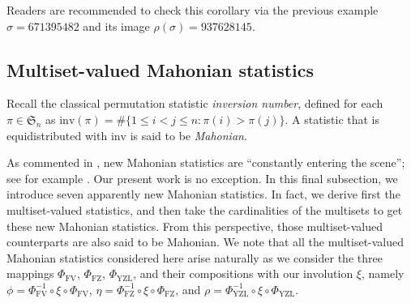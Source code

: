 \documentclass[12pt]{amsart}
\numberwithin{equation}{section}
\theoremstyle{plain}
\newtheorem{corollary}[theorem]{Corollary}
\theoremstyle{definition}
\def\FV{\mathrm{FV}}
\def\FZ{\mathrm{FZ}}
\def\YZL{\mathrm{YZL}}
\def\SS{\mathfrak{S}}
\def\vbot{\mathrm{vbot}}
\def\vedif{\mathrm{vedif}}
\def\vnest{\mathrm{vnest}}
\def\inv{\mathrm{inv}}
\def\inv{\mathrm{inv}}
\begin{document}

Readers are recommended to check this corollary via the previous example $\sigma=671395482$ and its image $\rho(\sigma)=937628145$.



\subsection{Multiset-valued Mahonian statistics}\label{subsec:Mahonian}
Recall the classical permutation statistic \emph{inversion number}, defined for each $\pi\in\SS_n$ as $\inv(\pi)=\#\{1\le i<j\le n : \pi(i)>\pi(j)\}.$ A statistic that is equidistributed with $\inv$ is said to be \emph{Mahonian}.

As commented in \cite{CSZ}, new Mahonian statistics are ``constantly entering the scene''; see for example \cite{FZ90,SS,CSZ,BS}. Our present work is no exception. In this final subsection, we introduce seven apparently new Mahonian statistics. In fact, we derive first the multiset-valued statistics, and then take the cardinalities of the multisets to get these new Mahonian statistics. From this perspective, those multiset-valued counterparts are also said to be Mahonian. We note that all the multiset-valued Mahonian statistics considered here arise naturally as we consider the three mappings $\Phi_{\FV}$, $\Phi_{\FZ}$, $\Phi_{\YZL}$, and their compositions with our involution $\xi$, namely $\phi=\Phi_{\FV}^{-1}\circ \xi \circ \Phi_{\FV}$, $\eta=\Phi_{\FZ}^{-1}\circ \xi \circ \Phi_{\FZ}$, and $\rho=\Phi_{\YZL}^{-1}\circ \xi \circ \Phi_{\YZL}$.
\end{document}
